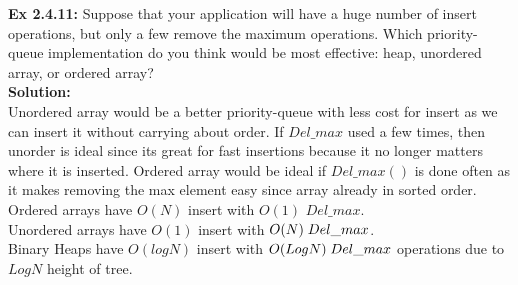 \documentclass[11pt,fleqn]{article}
\begin{document}
\textbf{Ex 2.4.11:} Suppose that your application will have a huge number of insert operations, but
only a few remove the maximum operations. Which priority-queue implementation do
you think would be most effective: heap, unordered array, or ordered array?\\
	
\textbf{Solution:}\\
Unordered array would be a better priority-queue with less cost for insert as we can insert it without carrying about order. If $Del\_max$ used a few times, then unorder is ideal since its great for fast insertions because it no longer matters where it is inserted. Ordered array would be ideal if $Del\_max()$ is done often as it makes removing the max element easy since array already in sorted order.\\

Ordered arrays have $O(N)$ insert with $O(1)$ $Del\_max$.\\
Unordered arrays have $O(1)$ insert with $O(N) \thickspace Del\_max$.\\
Binary Heaps have $O(logN)$ insert with $O(LogN) \thickspace Del\_max$ operations due to $Log N$ height of tree.\\
\end{document}
